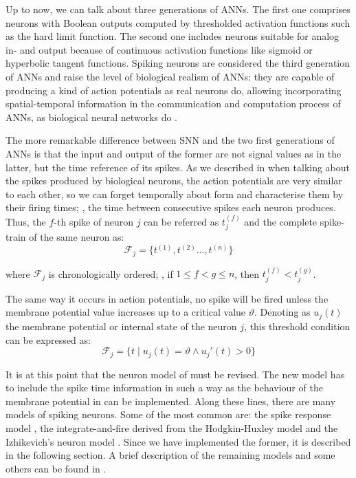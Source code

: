 
\label{subsec:ANN:SNN}

Up to now, we can talk about three generations of ANNs.
The first one comprises neurons with Boolean outputs computed by thresholded activation functions such as the hard limit function. 
The second one includes neurons suitable for analog in- and output because of continuous activation functions like sigmoid or hyperbolic tangent functions.
Spiking neurons are considered the third generation of ANNs and raise the level of biological realism of ANNs: they are capable of producing a kind of action potentials as real neurons do, allowing incorporating spatial-temporal information in the communication and computation process of ANNs, as biological neural networks do \cite{vreeken2002spiking}.

The more remarkable difference between SNN and the two first generations of ANNs is that 
the input and output of the former are not signal values as in the latter,
but the time reference of its spikes.
As we described in  when talking about the spikes produced by biological neurons, 
the action potentials are very similar to each other, 
so we can forget temporally about form and characterise them by their firing times; \ie, the time between consecutive spikes each neuron produces. Thus, the $f$-th spike of neuron $j$ can be referred as $t_{j}^{(f)}$ and the complete spike-train of the same neuron as: 
\begin{equation}
\mathcal{F}_{j}=\{t^{(1)},t^{(2)}...,t^{(n)}\}
\label{eq:spiketrain}
\end{equation}

where $\mathcal{F}_{j}$ is chronologically ordered; \ie,
if $1\leq f<g \leq n$, then $t_{j}^{(f)} < t_{j}^{(g)}$.

The same way it occurs in action potentials, no spike will be fired unless the membrane potential value increases up to a critical value $\vartheta$. Denoting as $u_{j}(t)$ the membrane potential or internal state of the neuron $j$, this threshold condition can be expressed as:
\begin{equation}
\mathcal{F}_{j}=\{t\mid u_{j}(t)=\vartheta\wedge u_{j}'(t)>0\}
\label{eq:thresspikecondition}
\end{equation}

It is at this point that the neuron model of  must be revised. 
The new model has to include the spike time information in such a way as the behaviour of the membrane potential in  can be implemented. 
Along these lines, there are many models of spiking neurons. Some of the most common are:
the spike response model \cite{gerstner2002spiking}, the integrate-and-fire derived from the Hodgkin-Huxley model \cite{chiu1979quantitative} and the Izhikevich's neuron model \cite{izhikevich2003simple}.
Since we have implemented the former, it is described in the following section. A brief description of the remaining models and some others can be found in \cite{paugam2012computing}.







